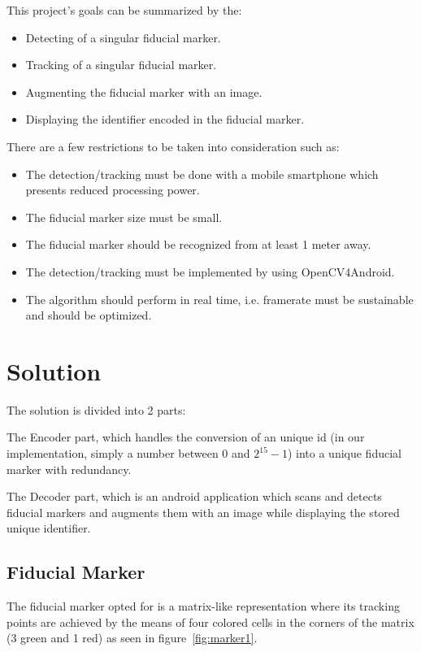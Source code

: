 \documentclass[DIV=calc, paper=a4, fontsize=11pt, twocolumn]{scrartcl}	 %
\begin{document}
This project’s goals can be summarized by the:
\begin{itemize}
\item Detecting of a singular fiducial marker.
\item Tracking of a singular fiducial marker.
\item Augmenting the fiducial marker with an image.
\item Displaying the identifier encoded in the fiducial marker.
\end{itemize}

There are a few restrictions to be taken into consideration such as:
\begin{itemize}
\item The detection/tracking must be done with a mobile smartphone which presents reduced processing power.
\item The fiducial marker size must be small.
\item The fiducial marker should be recognized from at least 1 meter away.
\item The detection/tracking must be implemented by using OpenCV4Android.
\item The algorithm should perform in real time, i.e. framerate must be sustainable and should be optimized.
\end{itemize}

\section*{Solution}

The solution is divided into 2 parts:


\begin{inparaenum}[(i)]
\item The Encoder part, which handles the conversion of an unique id (in our implementation, simply a number between 0 and $2^{15} - 1$) into a unique fiducial marker with redundancy. 


\item The Decoder part, which is an android application which scans and detects fiducial markers and augments them with an image while displaying the stored unique identifier.
\end{inparaenum}


\subsection*{Fiducial Marker}
The fiducial marker opted for is a matrix-like representation where its tracking points are achieved by the means of four colored cells in the corners of the matrix (3 green and 1 red) as seen in figure~\ref{fig:marker1}.
\end{document}
